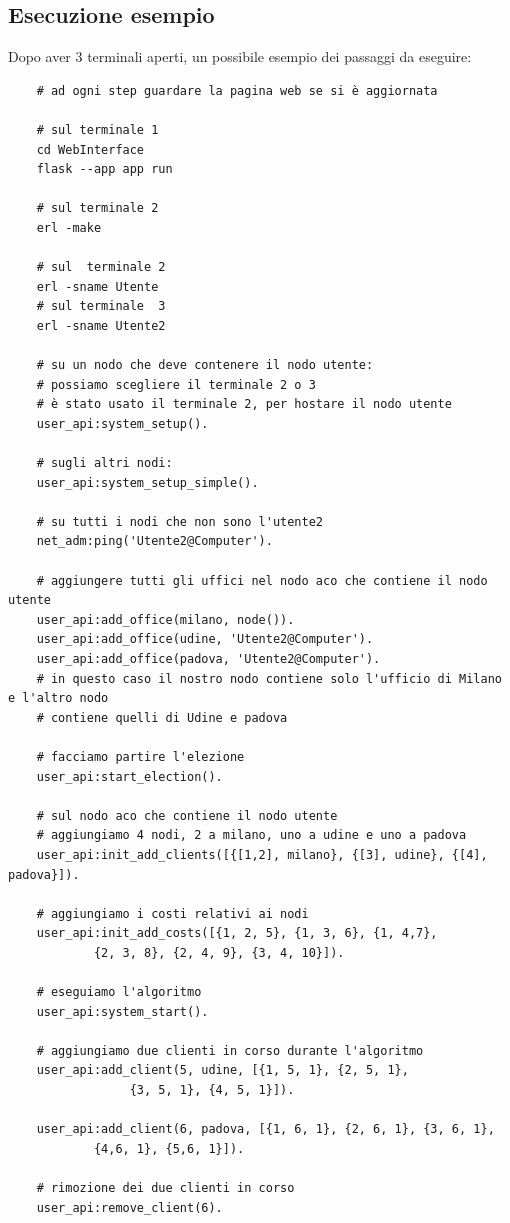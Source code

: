 \subsection{Esecuzione esempio}
Dopo aver 3 terminali aperti, un possibile esempio dei passaggi da eseguire:
\begin{verbatim}
    # ad ogni step guardare la pagina web se si è aggiornata

    # sul terminale 1
    cd WebInterface
    flask --app app run

    # sul terminale 2
    erl -make

    # sul  terminale 2
    erl -sname Utente
    # sul terminale  3
    erl -sname Utente2

    # su un nodo che deve contenere il nodo utente:
    # possiamo scegliere il terminale 2 o 3 
    # è stato usato il terminale 2, per hostare il nodo utente
    user_api:system_setup().

    # sugli altri nodi: 
    user_api:system_setup_simple().

    # su tutti i nodi che non sono l'utente2
    net_adm:ping('Utente2@Computer').

    # aggiungere tutti gli uffici nel nodo aco che contiene il nodo utente
    user_api:add_office(milano, node()).
    user_api:add_office(udine, 'Utente2@Computer').
    user_api:add_office(padova, 'Utente2@Computer').
    # in questo caso il nostro nodo contiene solo l'ufficio di Milano e l'altro nodo
    # contiene quelli di Udine e padova

    # facciamo partire l'elezione
    user_api:start_election().

    # sul nodo aco che contiene il nodo utente
    # aggiungiamo 4 nodi, 2 a milano, uno a udine e uno a padova
    user_api:init_add_clients([{[1,2], milano}, {[3], udine}, {[4], padova}]).

    # aggiungiamo i costi relativi ai nodi
    user_api:init_add_costs([{1, 2, 5}, {1, 3, 6}, {1, 4,7}, 
            {2, 3, 8}, {2, 4, 9}, {3, 4, 10}]).

    # eseguiamo l'algoritmo 
    user_api:system_start().

    # aggiungiamo due clienti in corso durante l'algoritmo
    user_api:add_client(5, udine, [{1, 5, 1}, {2, 5, 1},
                 {3, 5, 1}, {4, 5, 1}]).

    user_api:add_client(6, padova, [{1, 6, 1}, {2, 6, 1}, {3, 6, 1}, 
            {4,6, 1}, {5,6, 1}]).

    # rimozione dei due clienti in corso
    user_api:remove_client(6).


\end{verbatim}
